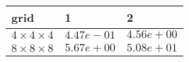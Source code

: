 \begin{tabular}{lll}
\hline
 grid                  & 1          & 2          \\
\hline
 $4 \times 4 \times 4$ & $4.47e-01$ & $4.56e+00$ \\
 $8 \times 8 \times 8$ & $5.67e+00$ & $5.08e+01$ \\
\hline
\end{tabular}